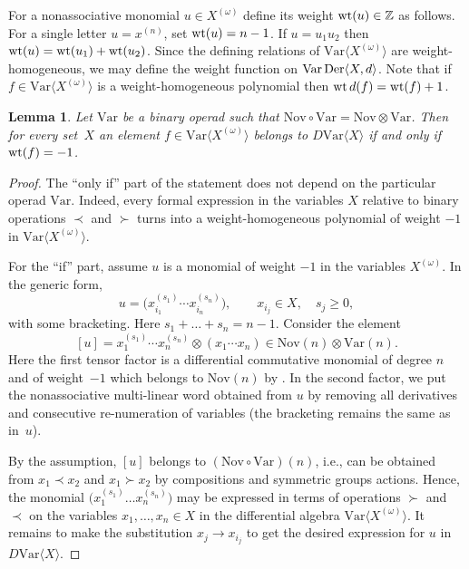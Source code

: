 \documentclass[11pt]{article}
\numberwithin{equation}{section}
\numberwithin{equation}{section}
\newtheorem{Lemma}[Theorem]{Lemma}
\def\Var{\mathrm{Var}}
\def\Nov{\mathrm{Nov}}
\def\wt {\mathop {\fam 0 wt}\nolimits}
\def\Der {\mathop {\fam 0 Der}\nolimits}
\begin{document}
For a nonassociative monomial $u\in X^{(\omega )}$ define its
weight $\wt(u)\in \mathbb Z$ as follows. For a single letter
$u=x^{(n)}$, set $\wt(u)=n-1$. If $u=u_1u_2$ then
$\wt(u) = \wt(u_1)+\wt(u_2)$.
Since the defining relations of $\Var\bigl\langle X^{(\omega )}\bigr\rangle $
are weight-homogeneous, we may define the weight function
on $\Var\Der\langle X,d\rangle $.
Note that if $f\in \Var\bigl\langle X^{(\omega )}\bigr\rangle $
is a weight-homogeneous polynomial then
$\wt d(f) = \wt(f)+1$.

\begin{Lemma}\label{lem:Weight-criterion}
 Let $\Var $ be a binary operad such that
 $\Nov\circ \Var = \Nov \otimes \Var $.
Then for every set~$X$ an element $f\in \Var\bigl\langle X^{(\omega )}\bigr\rangle $
belongs to $D\Var \langle X\rangle $ if and only if
$\wt (f)=-1$.
\end{Lemma}

\begin{proof}
The ``only if'' part of the statement does not depend on the particular operad $\Var $.
Indeed,
every formal expression in the variables $X$ relative to binary operations $\prec$
and $\succ $ turns into a weight-homogeneous polynomial of weight $-1$ in $\Var\bigl\langle X^{(\omega )}\bigr\rangle $.

For the ``if'' part, assume $u$ is a monomial of weight $-1$ in the variables $X^{(\omega )}$.
In the generic form,
\[
 u = \bigl(x_{i_1}^{(s_1)}\cdots x_{i_n}^{(s_n)}\bigr), \qquad x_{i_j}\in X,\quad s_j\ge 0,
\]
with some bracketing. Here $s_1+\dots +s_n = n-1$.
Consider the element
\[
[u] = x_{1}^{(s_1)}\cdots x_{n}^{(s_n)} \otimes (x_1\cdots x_n) \in \Nov(n)\otimes \Var(n).
\]
Here the first tensor factor is a differential commutative monomial of degree $n$ and of weight~$-1$
which belongs to $\Nov(n)$ by \cite{DzhLofwall2002}. In the second factor, we put the
nonassociative multi-linear word
obtained from $u$ by removing all derivatives and consecutive
re-numeration of variables (the bracketing remains the same as in~$u$).

By the assumption, $[u]$ belongs to $(\Nov\circ \Var)(n)$, i.e., can be obtained
from $x_1\prec x_2$ and $x_1\succ x_2$ by compositions and symmetric groups actions.
Hence,
the monomial $\bigl(x_{1}^{(s_1)}\dots x_{n}^{(s_n)}\bigr)$ may be expressed in terms of
operations $\succ $ and $\prec$ on the variables $x_1,\dots,x_n\in X$
in the differential algebra $\Var\bigl\langle X^{(\omega )}\bigr\rangle $.
It remains to make the substitution
$x_{j}\to x_{i_j}$ to get the desired expression for $u$ in $D\Var \langle X\rangle $.
\end{proof}
\end{document}
